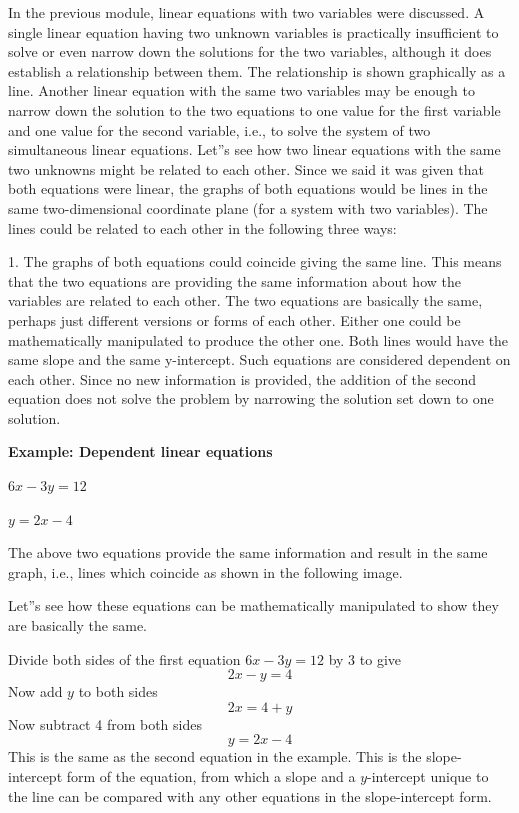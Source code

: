 In the previous module, linear equations with two variables were discussed. A single
linear equation having two unknown variables is practically insufficient to solve or even
narrow down the solutions for the two variables, although it does establish a relationship
between them. The relationship is shown graphically as a line. Another linear equation
with the same two variables may be enough to narrow down the solution to the two equations
to one value for the first variable and one value for the second variable, i.e., to solve
the system of two simultaneous linear equations. Let''s see how two linear equations with
the same two unknowns might be related to each other. Since we said it was given that both
equations were linear, the graphs of both equations would be lines in the same
two-dimensional coordinate plane (for a system with two variables). The lines could be
related to each other in the following three ways:

1. The graphs of both equations could coincide giving the same line. This means that the
two equations are providing the same information about how the variables are related to
each other. The two equations are basically the same, perhaps just different versions or
forms of each other. Either one could be mathematically manipulated to produce the other
one. Both lines would have the same slope and the same y-intercept. Such equations are
considered dependent on each other. Since no new information is provided, the addition of
the second equation does not solve the problem by narrowing the solution set down to one
solution.

   \textbf{Example: Dependent linear equations}

   $6x - 3y = 12$

   $y = 2x - 4$

The above two equations provide the same information and result in the same graph, i.e.,
lines which coincide as shown in the following image.


Let''s see how these equations can be mathematically manipulated to show they are
basically the same.

Divide both sides of the first equation $6x - 3y = 12$ by 3 to give
\[
2x - y = 4
\]
Now add $y$ to both sides
\[
2x = 4 + y
\]
Now subtract 4 from both sides
\[
y = 2x - 4
\]
This is the same as the second equation in the example. This is the slope-intercept form of the equation, from which a slope and a $y$-intercept unique to the line can be compared with any other equations in the slope-intercept form.

